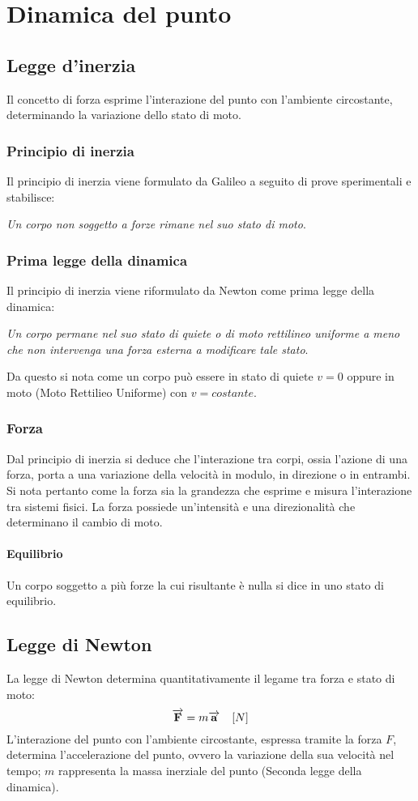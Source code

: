 \documentclass[class=book, crop=false, oneside, 12pt]{standalone}
\begin{document}
\chapter{Dinamica del punto}

\section{Legge d'inerzia}
Il concetto di forza esprime l'interazione del punto con l'ambiente circostante, determinando la variazione dello stato di moto.
\subsection{Principio di inerzia}
Il principio di inerzia viene formulato da Galileo a seguito di prove sperimentali e stabilisce:
\begin{center}
    \emph{Un corpo non soggetto a forze rimane nel suo stato di moto}.
\end{center}
\subsection{Prima legge della dinamica}
Il principio di inerzia viene riformulato da Newton come prima legge della dinamica:
\begin{center}
    \emph{Un corpo permane nel suo stato di quiete o di moto rettilineo uniforme a meno che non intervenga una forza esterna a modificare tale stato}.
\end{center}
Da questo si nota come un corpo può essere in stato di quiete \(v = 0\) oppure in moto (Moto Rettilieo Uniforme) con \(v = costante\).
\subsection{Forza}
Dal principio di inerzia si deduce che l'interazione tra corpi, ossia l'azione di una forza, porta a una variazione della velocità in modulo, in direzione o in entrambi.
Si nota pertanto come la forza sia la grandezza che esprime e misura l'interazione tra sistemi fisici.
La forza possiede un'intensit\`a e una direzionalit\`a che determinano il cambio di moto.
\subsubsection{Equilibrio}
Un corpo soggetto a pi\`u forze la cui risultante \`e nulla si dice in uno stato di equilibrio.
\section{Legge di Newton}
La legge di Newton determina quantitativamente il legame tra forza e stato di moto:
\begin{equation}
    \overrightarrow{F} = m \overrightarrow{a} \ \udm{N}
\end{equation}
L'interazione del punto con l'ambiente circostante, espressa tramite la forza \(F\), determina l'accelerazione del punto, ovvero la variazione della sua velocità nel tempo; \(m\) rappresenta la massa inerziale del punto (Seconda legge della dinamica).
\end{document}
